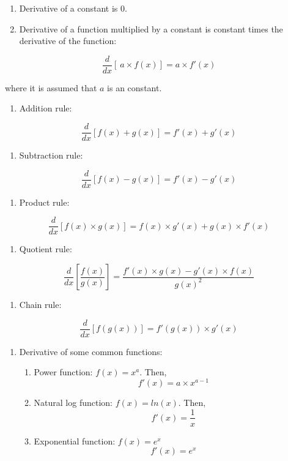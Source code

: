 \documentclass[
]{book}
\providecommand{\tightlist}{%
  \setlength{\itemsep}{0pt}\setlength{\parskip}{0pt}}
\theoremstyle{definition}
\theoremstyle{definition}
\theoremstyle{definition}
\theoremstyle{definition}
\theoremstyle{remark}
\begin{document}
\begin{enumerate}
\def\labelenumi{\arabic{enumi}.}
\item
  Derivative of a constant is \(0\).
\item
  Derivative of a function multiplied by a constant is constant times the derivative of the function:
\end{enumerate}

\[\frac{d}{dx} [\ a\times f(x)]=a\times f'(x)\]

where it is assumed that \(a\) is an constant.

\begin{enumerate}
\def\labelenumi{\arabic{enumi}.}
\setcounter{enumi}{2}
\tightlist
\item
  Addition rule:
\end{enumerate}

\[ \frac{d}{dx} [f(x)+ g(x)]=f'(x)+ g'(x) \]

\begin{enumerate}
\def\labelenumi{\arabic{enumi}.}
\setcounter{enumi}{3}
\tightlist
\item
  Subtraction rule:
\end{enumerate}

\[ \frac{d}{dx} [f(x)- g(x)]=f'(x)-g'(x) \]

\begin{enumerate}
\def\labelenumi{\arabic{enumi}.}
\setcounter{enumi}{4}
\tightlist
\item
  Product rule:
\end{enumerate}

\[ \frac{d}{dx} [f(x)\times g(x)]= f(x) \times g'(x) + g(x)\times f'(x)\]

\begin{enumerate}
\def\labelenumi{\arabic{enumi}.}
\setcounter{enumi}{5}
\tightlist
\item
  Quotient rule:
\end{enumerate}

\[ \frac{d}{dx} \left[\frac{f(x)}{g(x)}\right]=\frac{f'(x) \times g(x) - g'(x) \times f(x)}{g(x)^2}\]

\begin{enumerate}
\def\labelenumi{\arabic{enumi}.}
\setcounter{enumi}{6}
\tightlist
\item
  Chain rule:
\end{enumerate}

\[ \frac{d}{dx} [f(g(x))] = f'(g(x)) \times g'(x)\]

\begin{enumerate}
\def\labelenumi{\arabic{enumi}.}
\setcounter{enumi}{7}
\item
  Derivative of some common functions:

  \begin{enumerate}
  \def\labelenumii{\alph{enumii}.}
  \item
    Power function: \(f(x)=x^a\). Then,
    \[f'(x)=a \times x^{a-1}\]
  \item
    Natural log function: \(f(x)=ln(x)\). Then,
    \[f'(x) = \frac{1}{x}\]
  \item
    Exponential function: \(f(x)=e^x\)
    \[f'(x)=e^x\]
  \end{enumerate}
\end{enumerate}
\end{document}
